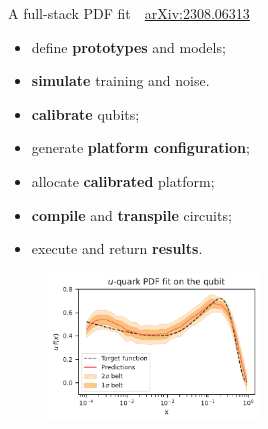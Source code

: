 \documentclass[8pt, xcolor={svgnames}, hyperref={linkcolor=black}]{beamer}
\begin{document}
\begin{frame}{A full-stack PDF fit \hfill \faBook\,\, \href{https://arxiv.org/abs/2308.06313}{arXiv:2308.06313}}

\begin{multicols}{2}
\pause
\hspace{2cm}
\begin{tcolorbox}[title=High level API: Qibo, colback=blue!20]
\begin{itemize}[noitemsep]
\small
   \item[\faCode] define \textbf{prototypes} and models;
   \item[\faCode] \textbf{simulate} training and noise.
\end{itemize}
\end{tcolorbox}
\pause
\begin{tcolorbox}[title=Calibration: Qibocal, colback=yellow!20]
\begin{itemize}[noitemsep]
\small
   \item[\faCrosshairs] \textbf{calibrate} qubits;
   \item[\faCrosshairs] generate \textbf{platform configuration};
\end{itemize}
\end{tcolorbox}
\pause
\begin{tcolorbox}[title=Execution: Qibolab, colback=red!20]
\begin{itemize}[noitemsep]
\small
   \item[\faCog] allocate \textbf{calibrated} platform;
   \item[\faCog] \textbf{compile} and \textbf{transpile} circuits;
   \item[\faCog] execute and return \textbf{results}.
\end{itemize}
\end{tcolorbox}
\pause
\begin{figure}  
    \includegraphics[width=0.5\textwidth]{figures/qpdf.pdf}
\end{figure}
\begin{table}

\end{table}
\end{multicols}
\end{frame}
\end{document}
